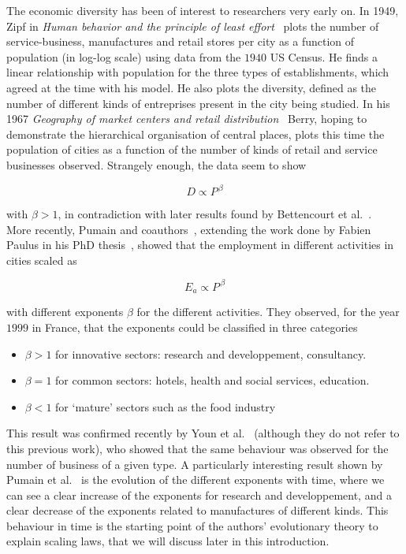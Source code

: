 The economic diversity has been of interest to researchers very early on. In
1949, Zipf in \emph{Human behavior and the principle of least
effort}~\cite{Zipf:1949} plots the number of service-business, manufactures and
retail stores per city as a function of population (in log-log scale) using data
from the $1940$ US Census. He finds a linear relationship with population for
the three types of establishments, which agreed at the time with his model. He
also plots the diversity, defined as the number of different kinds of
entreprises present in the city being studied. In his 1967 \emph{Geography of
market centers and retail distribution}~\cite{Berry:1967} Berry, hoping to
demonstrate the hierarchical organisation of central places, plots this time
the population of cities as a function of the number of kinds of retail and
service businesses observed. Strangely enough, the data seem to show

\begin{equation}
    D \propto P^{\, \beta}
\end{equation}

with $\beta > 1$, in contradiction with later results found by Bettencourt et
al.~\cite{Bettencourt:2014}.\\

More recently, Pumain and coauthors~\cite{Pumain:2006}, extending the work done
by Fabien Paulus in his PhD thesis~\cite{Paulus:2004}, showed that the
employment in different activities in cities scaled as

\begin{equation}
    E_a \propto P^{\,\beta}
\end{equation}

with different exponents $\beta$ for the different activities. They observed,
for the year $1999$ in France, that the exponents could be classified in three
categories

\begin{itemize}
    \item $\beta > 1$ for innovative sectors: research and developpement,
        consultancy.
    \item $\beta = 1$ for common sectors: hotels, health and social services,
        education.
    \item $\beta < 1$ for `mature' sectors such as the food industry
\end{itemize}

This result was confirmed recently by Youn et al.~\cite{Youn:2014} (although
they do not refer to this previous work), who showed that the same behaviour was
observed for the number of business of a given type. A particularly interesting
result shown by Pumain et al.~\cite{Pumain:2006} is the evolution of the
different exponents with time, where we can see a clear increase of the
exponents for research and developpement, and a clear decrease of the exponents
related to manufactures of different kinds. This behaviour in time is the
starting point of the authors' evolutionary theory to explain scaling laws, that
we will discuss later in this introduction.\\

